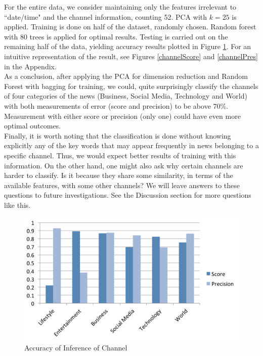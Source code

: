 \documentclass{article} %
\begin{document}
For the entire data, we consider maintaining only the features irrelevant to ``date/time" and the channel information, counting 52. PCA with $k = 25$ is applied. Training is done on half of the dataset, randomly
chosen. Random forest with 80 trees is applied for optimal results. Testing is carried out on the remaining half of the data, yielding accuracy results plotted in Figure \ref{channelBar}. For an intuitive representation of the result, see
Figures \ref{channelScore} and  \ref{channelPres} in the Appendix.
\\

As a conclusion, after applying the PCA for dimension reduction and Random Forest with bagging for training, we could, quite surprisingly classify the channels of four categories of the news (Business, Social Media,
Technology and World) with both measurements of error (score and precision) to be above $70\%$. Measurement with either score or precision (only one) could have even more optimal outcomes. 
\\

Finally, it is worth
noting that the classification is done without knowing explicitly any of the key words that may appear frequently in news belonging to a specific channel. Thus, we would expect better results of training with this 
information. On the other hand, one might also ask why certain channels are harder to classify. Is it because they share some similarity, in terms of the available features, with some other channels? We will leave 
answers to these questions to future investigations. See the Discussion section for more questions like this.

\begin{figure}[h!]
	\centering
	\includegraphics[scale = 0.5]{precision.pdf}
	\caption{Accuracy of Inference of Channel}
	\label{channelBar}
\end{figure}
\end{document}
